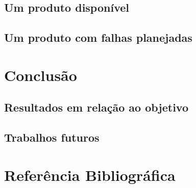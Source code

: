 \documentclass[]{../class/politex}
\begin{document}
    \section{Um produto disponível}

    \section{Um produto com falhas planejadas}

  \chapter{Conclusão}

    \section{Resultados em relação ao objetivo}

    \section{Trabalhos futuros}

  \chapter{Referência Bibliográfica}
\end{document}
